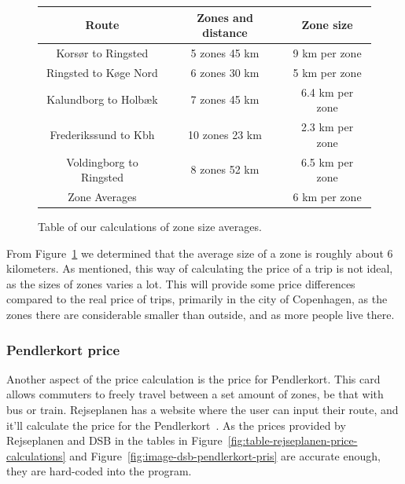 \begin{figure}[H]
    \centering
    \noindent
    \begin{tabular}{ || c | c | c || }
        \hline
        Route & Zones and distance & Zone size \\
        \hline\hline
        Korsør to Ringsted & 5 zones 45 km & 9 km per zone \\
        \hline
        Ringsted to Køge Nord & 6 zones 30 km & 5 km per zone \\
        \hline
        Kalundborg to Holbæk & 7 zones 45 km & 6.4 km per zone \\
        \hline
        Frederikssund to Kbh & 10 zones 23 km & 2.3 km per zone \\
        \hline
        Voldingborg to Ringsted & 8 zones 52 km & 6.5 km per zone \\
        \hline\hline
        Zone Averages & & 6 km per zone \\
        \hline
    \end{tabular}
    \caption{Table of our calculations of zone size averages.}
    \label{fig:table-zone-size-averages}
\end{figure}

From Figure~\ref{fig:table-zone-size-averages} we determined that the average size of a zone is roughly about 6
kilometers.
As mentioned, this way of calculating the price of a trip is not ideal, as the sizes of zones varies a lot.
This will provide some price differences compared to the real price of trips, primarily in the city of Copenhagen,
as the zones there are considerable smaller than outside, and as more people live there.

\subsubsection{Pendlerkort price}

Another aspect of the price calculation is the price for Pendlerkort.
This card allows commuters to freely travel between a set amount of zones, be that with bus or train.
Rejseplanen has a website where the user can input their route, and it'll calculate the price for the
Pendlerkort~\cite{price_calculator}.
As the prices provided by Rejseplanen and DSB in the tables in Figure~\ref{fig:table-rejseplanen-price-calculations} and
Figure~\ref{fig:image-dsb-pendlerkort-pris} are accurate enough, they are hard-coded into the program.

